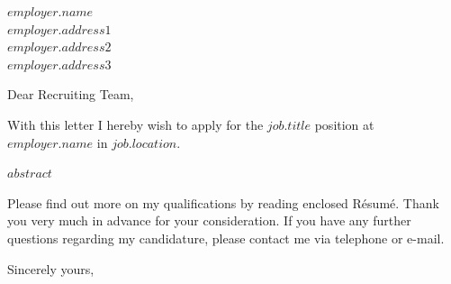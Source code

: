 \documentclass[10pt,a4paper]{letter}
\begin{document}
 
\begin{letter}{$employer.name$ \\ $employer.address1$ \\ $employer.address2$ \\ $employer.address3$} 
\opening{Dear Recruiting Team,} 
With this letter I hereby wish to apply for the \textbf{$job.title$} position at $employer.name$ in $job.location$.

$abstract$


Please find out more on my qualifications by reading enclosed Résumé. Thank you very much in advance for your consideration. If you have any further questions regarding my candidature, please contact me via telephone or e-mail.


\closing{Sincerely yours,\\
 \\
}
 
\end{letter} 
\end{document}
